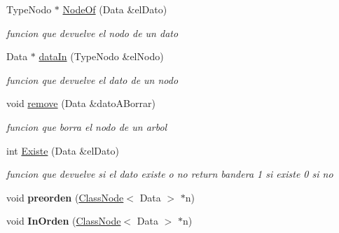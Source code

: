 \begin{DoxyCompactItemize}
\mbox{\label{class_binary_search_tree_a2267a608fb78e1eafe4531a67d2bf7c8}} 
Type\+Nodo $\ast$ \hyperlink{class_binary_search_tree_a2267a608fb78e1eafe4531a67d2bf7c8}{Node\+Of} (Data \&el\+Dato)
\begin{DoxyCompactList}\small\item\em funcion que devuelve el nodo de un dato \end{DoxyCompactList}\item 
\mbox{\label{class_binary_search_tree_ac08a812f7c83c1ee9a274099b38b5a62}} 
Data $\ast$ \hyperlink{class_binary_search_tree_ac08a812f7c83c1ee9a274099b38b5a62}{data\+In} (Type\+Nodo \&el\+Nodo)
\begin{DoxyCompactList}\small\item\em funcion que devuelve el dato de un nodo \end{DoxyCompactList}\item 
\mbox{\label{class_binary_search_tree_a00b5c4aef3fae5ec348363e29e8b5cbf}} 
void \hyperlink{class_binary_search_tree_a00b5c4aef3fae5ec348363e29e8b5cbf}{remove} (Data \&dato\+A\+Borrar)
\begin{DoxyCompactList}\small\item\em funcion que borra el nodo de un arbol \end{DoxyCompactList}\item 
\mbox{\label{class_binary_search_tree_a6c83485425575c196701ca5e28d7f0e6}} 
int \hyperlink{class_binary_search_tree_a6c83485425575c196701ca5e28d7f0e6}{Existe} (Data \&el\+Dato)
\begin{DoxyCompactList}\small\item\em funcion que devuelve si el dato existe o no return bandera 1 si existe 0 si no \end{DoxyCompactList}\item 
\mbox{\label{class_binary_search_tree_ad1ef774f107b357863b1b578d0723553}} 
void {\bfseries preorden} (\hyperlink{class_class_node}{Class\+Node}$<$ Data $>$ $\ast$n)
\item 
\mbox{\label{class_binary_search_tree_a957d1cd0c14f897c4847753ce82a41d7}} 
void {\bfseries In\+Orden} (\hyperlink{class_class_node}{Class\+Node}$<$ Data $>$ $\ast$n)

\end{DoxyCompactItemize}
